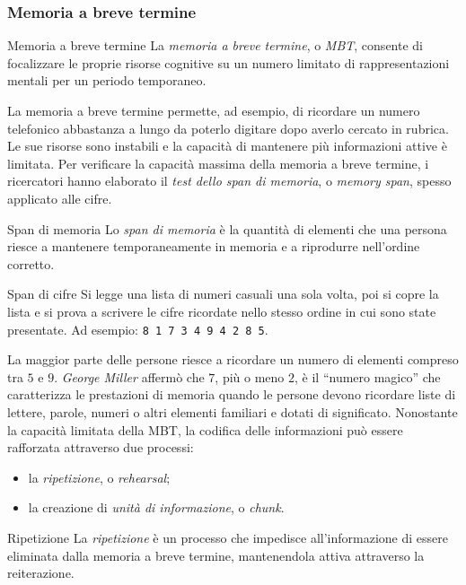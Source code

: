 \documentclass[a4paper]{article}
\begin{document}
\subsubsection{Memoria a breve termine}
\begin{snippetdefinition}{Memoria a breve termine}
    La \emph{memoria a breve termine}, o \emph{MBT}, consente di focalizzare le proprie risorse cognitive su un numero limitato di rappresentazioni mentali per un periodo temporaneo.
\end{snippetdefinition}
La memoria a breve termine permette, ad esempio, di ricordare un numero telefonico abbastanza a lungo da poterlo digitare dopo averlo cercato in rubrica. Le sue risorse sono instabili e la capacità di mantenere più informazioni attive è limitata.
Per verificare la capacità massima della memoria a breve termine, i ricercatori hanno elaborato il \emph{test dello span di memoria}, o \emph{memory span}, spesso applicato alle cifre.
\begin{snippetdefinition}{Span di memoria}
    Lo \emph{span di memoria} è la quantità di elementi che una persona riesce a mantenere temporaneamente in memoria e a riprodurre nell'ordine corretto.
\end{snippetdefinition}
\begin{snippetexample}{Span di cifre}
    Si legge una lista di numeri casuali una sola volta, poi si copre la lista e si prova a scrivere le cifre ricordate nello stesso ordine in cui sono state presentate. Ad esempio: \texttt{8 1 7 3 4 9 4 2 8 5}.
\end{snippetexample}
La maggior parte delle persone riesce a ricordare un numero di elementi compreso tra \(5\) e \(9\). \emph{George Miller} affermò che \(7\), più o meno \(2\), è il ``numero magico'' che caratterizza le prestazioni di memoria quando le persone devono ricordare liste di lettere, parole, numeri o altri elementi familiari e dotati di significato.
Nonostante la capacità limitata della MBT, la codifica delle informazioni può essere rafforzata attraverso due processi:
\begin{itemize}
    \item la \emph{ripetizione}, o \emph{rehearsal};
    \item la creazione di \emph{unità di informazione}, o \emph{chunk}.
\end{itemize}
\begin{snippetdefinition}{Ripetizione}
    La \emph{ripetizione} è un processo che impedisce all'informazione di essere eliminata dalla memoria a breve termine, mantenendola attiva attraverso la reiterazione.
\end{snippetdefinition}
\end{document}
